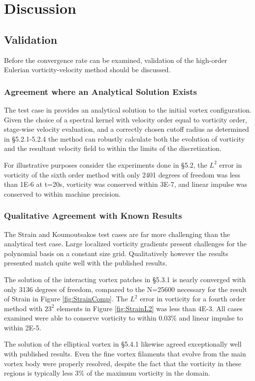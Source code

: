 \documentclass[letterpaper,12pt]{report}
\begin{document}
\chapter{Discussion}
\section{Validation}
Before the convergence rate can be examined, validation of the high-order Eulerian vorticity-velocity method should be discussed.
\subsection{Agreement where an Analytical Solution Exists}
The test case in \cite{Perlmann1985} provides an analytical solution to the initial vortex configuration. Given the choice of a spectral kernel with velocity order equal to vorticity order, stage-wise velocity evaluation, and a correctly chosen cutoff radius as determined in \S5.2.1-5.2.4 the method can robustly calculate both the evolution of vorticity and the resultant velocity field to within the limits of the discretization. 

For illustrative purposes consider the experiments done in \S5.2, the $L^2$ error in vorticity of the sixth order method with only 2401 degrees of freedom was less than 1E-6 at t=20s, vorticity was conserved within 3E-7, and linear impulse was conserved to within machine precision.
\subsection{Qualitative Agreement with Known Results}
The Strain \cite{Strain1996} and Koumoutsakos \cite{Koum1997} test cases are far more challenging than the analytical test case. Large localized vorticity gradients present challenges for the polynomial basis on a constant size grid. Qualitatively however the results presented match quite well with the published results.

The solution of the interacting vortex patches in \S5.3.1 is nearly converged with only 3136 degrees of freedom, compared to the N=25600 necessary for the result of Strain in Figure \ref{fig:StrainComp}. The $L^2$ error in vorticity for a fourth order method with $23^2$ elements in Figure \ref{fig:StrainL2} was less than 4E-3. All cases examined were able to conserve vorticity to within 0.03\% and linear impulse to within 2E-5.

The solution of the elliptical vortex in \S5.4.1 likewise agreed exceptionally well with published results. Even the fine vortex filaments that evolve from the main vortex body were properly resolved, despite the fact that the vorticity in these regions is typically less 3\% of the maximum vorticity in the domain. 
\end{document}

